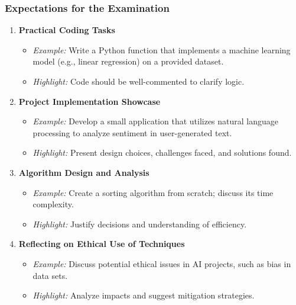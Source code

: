 \documentclass[aspectratio=169]{beamer}
\begin{document}
\begin{frame}[fragile]
    \frametitle{Expectations for the Examination}
    \begin{enumerate}
        \item \textbf{Practical Coding Tasks}
        \begin{itemize}
            \item \textit{Example:} Write a Python function that implements a machine learning model (e.g., linear regression) on a provided dataset.
            \item \textit{Highlight:} Code should be well-commented to clarify logic.
        \end{itemize}

        \item \textbf{Project Implementation Showcase}
        \begin{itemize}
            \item \textit{Example:} Develop a small application that utilizes natural language processing to analyze sentiment in user-generated text.
            \item \textit{Highlight:} Present design choices, challenges faced, and solutions found.
        \end{itemize}

        \item \textbf{Algorithm Design and Analysis}
        \begin{itemize}
            \item \textit{Example:} Create a sorting algorithm from scratch; discuss its time complexity.
            \item \textit{Highlight:} Justify decisions and understanding of efficiency.
        \end{itemize}

        \item \textbf{Reflecting on Ethical Use of Techniques}
        \begin{itemize}
            \item \textit{Example:} Discuss potential ethical issues in AI projects, such as bias in data sets.
            \item \textit{Highlight:} Analyze impacts and suggest mitigation strategies.
        \end{itemize}
    \end{enumerate}
\end{frame}
\end{document}
